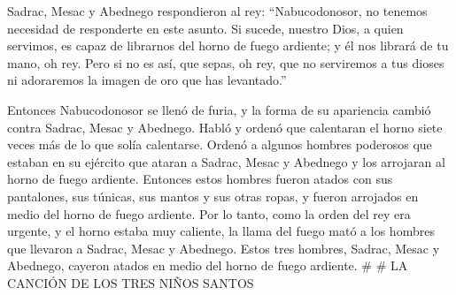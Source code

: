  Sadrac, Mesac y Abednego respondieron al rey:
``Nabucodonosor, no tenemos necesidad de responderte en este asunto.
 Si sucede, nuestro Dios, a quien servimos, es capaz de
librarnos del horno de fuego ardiente; y él nos librará de tu mano, oh
rey.  Pero si no es así, que sepas, oh rey, que no
serviremos a tus dioses ni adoraremos la imagen de oro que has
levantado.''

 Entonces Nabucodonosor se llenó de furia, y la forma de
su apariencia cambió contra Sadrac, Mesac y Abednego. Habló y ordenó que
calentaran el horno siete veces más de lo que solía calentarse.
 Ordenó a algunos hombres poderosos que estaban en su
ejército que ataran a Sadrac, Mesac y Abednego y los arrojaran al horno
de fuego ardiente.  Entonces estos hombres fueron atados
con sus pantalones, sus túnicas, sus mantos y sus otras ropas, y fueron
arrojados en medio del horno de fuego ardiente.  Por lo
tanto, como la orden del rey era urgente, y el horno estaba muy
caliente, la llama del fuego mató a los hombres que llevaron a Sadrac,
Mesac y Abednego.  Estos tres hombres, Sadrac, Mesac y
Abednego, cayeron atados en medio del horno de fuego ardiente. \# \# LA
CANCIÓN DE LOS TRES NIÑOS SANTOS

